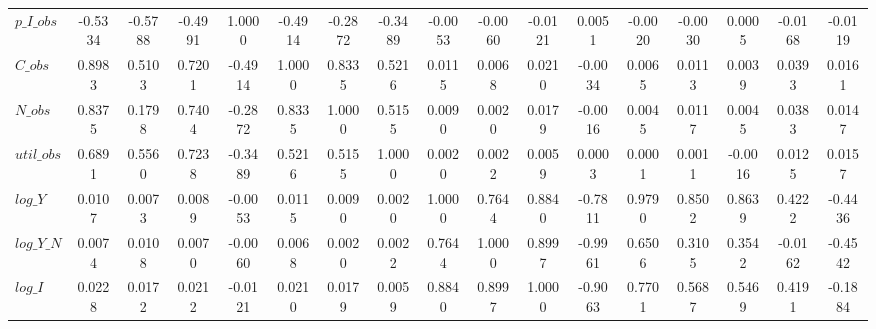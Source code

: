 \begin{center}
\begin{longtable}{lcccccccccccccccc}
$p\_I\_obs       $	 & 	           -0.5334	 & 	           -0.5788	 & 	           -0.4991	 & 	            1.0000	 & 	           -0.4914	 & 	           -0.2872	 & 	           -0.3489	 & 	           -0.0053	 & 	           -0.0060	 & 	           -0.0121	 & 	            0.0051	 & 	           -0.0020	 & 	           -0.0030	 & 	            0.0005	 & 	           -0.0168	 & 	           -0.0119 \\ 
$C\_obs          $	 & 	            0.8983	 & 	            0.5103	 & 	            0.7201	 & 	           -0.4914	 & 	            1.0000	 & 	            0.8335	 & 	            0.5216	 & 	            0.0115	 & 	            0.0068	 & 	            0.0210	 & 	           -0.0034	 & 	            0.0065	 & 	            0.0113	 & 	            0.0039	 & 	            0.0393	 & 	            0.0161 \\ 
$N\_obs          $	 & 	            0.8375	 & 	            0.1798	 & 	            0.7404	 & 	           -0.2872	 & 	            0.8335	 & 	            1.0000	 & 	            0.5155	 & 	            0.0090	 & 	            0.0020	 & 	            0.0179	 & 	           -0.0016	 & 	            0.0045	 & 	            0.0117	 & 	            0.0045	 & 	            0.0383	 & 	            0.0147 \\ 
$util\_obs       $	 & 	            0.6891	 & 	            0.5560	 & 	            0.7238	 & 	           -0.3489	 & 	            0.5216	 & 	            0.5155	 & 	            1.0000	 & 	            0.0020	 & 	            0.0022	 & 	            0.0059	 & 	            0.0003	 & 	            0.0001	 & 	            0.0011	 & 	           -0.0016	 & 	            0.0125	 & 	            0.0157 \\ 
$log\_Y          $	 & 	            0.0107	 & 	            0.0073	 & 	            0.0089	 & 	           -0.0053	 & 	            0.0115	 & 	            0.0090	 & 	            0.0020	 & 	            1.0000	 & 	            0.7644	 & 	            0.8840	 & 	           -0.7811	 & 	            0.9790	 & 	            0.8502	 & 	            0.8639	 & 	            0.4222	 & 	           -0.4436 \\ 
$log\_Y\_N       $	 & 	            0.0074	 & 	            0.0108	 & 	            0.0070	 & 	           -0.0060	 & 	            0.0068	 & 	            0.0020	 & 	            0.0022	 & 	            0.7644	 & 	            1.0000	 & 	            0.8997	 & 	           -0.9961	 & 	            0.6506	 & 	            0.3105	 & 	            0.3542	 & 	           -0.0162	 & 	           -0.4542 \\ 
$log\_I          $	 & 	            0.0228	 & 	            0.0172	 & 	            0.0212	 & 	           -0.0121	 & 	            0.0210	 & 	            0.0179	 & 	            0.0059	 & 	            0.8840	 & 	            0.8997	 & 	            1.0000	 & 	           -0.9063	 & 	            0.7701	 & 	            0.5687	 & 	            0.5469	 & 	            0.4191	 & 	           -0.1884 \\ 

\end{longtable}
\end{center}
